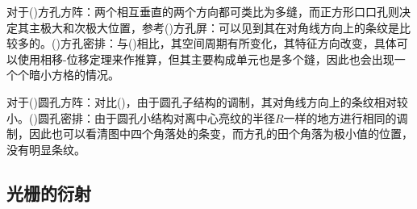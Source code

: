 \documentclass[a4paper]{article}
\begin{document}
\hspace{2em}对于()方孔方阵：两个相互垂直的两个方向都可类比为多缝，而正方形口口孔则决定其主极大和次极大位置，参考()方孔屏：可以见到其在对角线方向上的条纹是比较多的。()方孔密排：与()相比，其空间周期有所变化，其特征方向改变，具体可以使用相移-位移定理来作推算，但其主要构成单元也是多个鏠，因此也会出现一个个暗小方格的情况。\par
\hspace{2em}对于()圆孔方阵：对比()，由于圆孔子结构的调制，其对角线方向上的条纹相对较小。()圆孔密排：由于圆孔小结构对离中心亮纹的半径$R$一样的地方进行相同的调制，因此也可以看清图中四个角落处的条变，而方孔的田个角落为极小值的位置，没有明显条纹。\par


\subsection{光栅的衍射}

\end{document}
